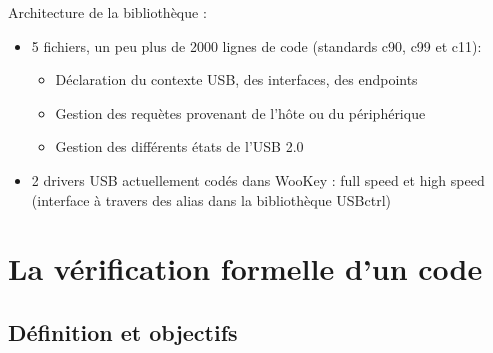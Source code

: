\documentclass[french]{beamer}
\begin{document}
\begin{frame}

Architecture de la bibliothèque :
\begin{itemize}
	\item  5 fichiers, un peu plus de 2000 lignes de code (standards c90, c99 et c11):  %
		\begin{itemize}
			\item Déclaration du contexte USB, des interfaces, des endpoints %
			\item Gestion des requètes provenant de l'hôte ou du périphérique
			\item Gestion des différents états de l'USB 2.0
		\end{itemize}
	\item 2 drivers USB actuellement codés dans WooKey : full speed et high speed (interface à travers des alias dans la bibliothèque USBctrl)
\end{itemize}

\end{frame}




\section[Méthodes formelles]{La vérification formelle d'un code}

\subsection{Définition et objectifs}
\end{document}

